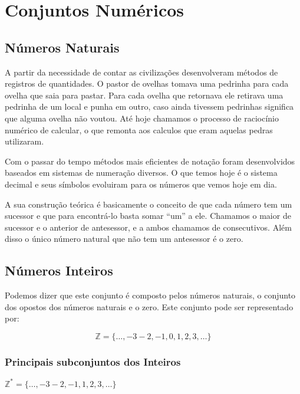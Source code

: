 
\chapter{Conjuntos Numéricos}

\section{Números Naturais}
A partir da necessidade de contar as civilizações desenvolveram métodos de registros de quantidades. O pastor de ovelhas tomava uma pedrinha para cada ovelha que saia para pastar. Para cada ovelha que retornava ele retirava uma pedrinha de um local e punha em outro, caso ainda tivessem pedrinhas significa que alguma ovelha não voutou. Até hoje chamamos o processo de raciocínio numérico de calcular, o que remonta aos calculos que eram aquelas pedras utilizaram.

Com o passar do tempo métodos mais eficientes de notação foram desenvolvidos baseados em sistemas de numeração diversos. O que temos hoje é o sistema decimal e seus símbolos evoluiram para os números que vemos hoje em dia.

A sua construção teórica é basicamente o conceito de que cada número tem um sucessor e que para encontrá-lo basta somar ``um'' a ele. Chamamos o maior de sucessor e o anterior de antesessor, e a ambos chamamos de consecutivos. Além disso o único número natural que não tem um antesessor é o zero.

\begin{center}
\end{center}

\section{Números Inteiros}
Podemos dizer que este conjunto é composto pelos números naturais, o conjunto dos opostos dos números naturais e o zero. Este conjunto pode ser representado por:

$$\mathbb{Z}=\{\dots, -3 -2, -1, 0, 1,2 ,3 , \dots \}$$

\subsection{Principais subconjuntos dos Inteiros}

$\mathbb{Z}^*=\{\dots, -3 -2, -1, 1,2 ,3 , \dots \}$

